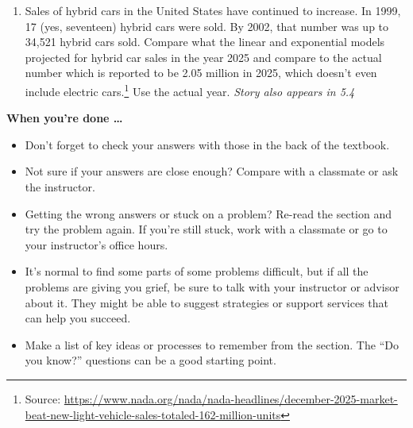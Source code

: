 \begin{enumerate}
\item %
Sales of hybrid cars in the United States have continued to increase. In 1999, 17 (yes,
seventeen) hybrid cars were sold. By 2002, that number was up to 34,521 hybrid cars
sold. Compare what the linear and exponential models
projected for hybrid car sales in the year 2025 and compare to the actual number which is reported to be 2.05 million in 2025, which doesn't even include electric cars.\footnote{Source: \url{https://www.nada.org/nada/nada-headlines/december-2025-market-beat-new-light-vehicle-sales-totaled-162-million-units}} Use the actual year.  
\hfill \emph{Story also appears in 5.4}


\end{enumerate}

\bigskip

\noindent \textbf{When you're done \ldots}

\begin{itemize}
\item Don't forget to check your answers with those in the back of the textbook. 
\item Not sure if your answers are close enough? Compare with a classmate or ask the instructor.  
\item Getting the wrong answers or stuck on a problem?  Re-read the section and try the problem again.   If you're still stuck, work with a classmate or go to your instructor's office hours.
\item It's normal to find some parts of some problems difficult, but if all the problems are giving you grief, be sure to talk with your instructor or advisor about it.  They might be able to suggest strategies or support services that can help you succeed.
\item Make a list of key ideas or processes to remember from the section.  The ``Do you know?'' questions can be a good starting point.
\end{itemize}




